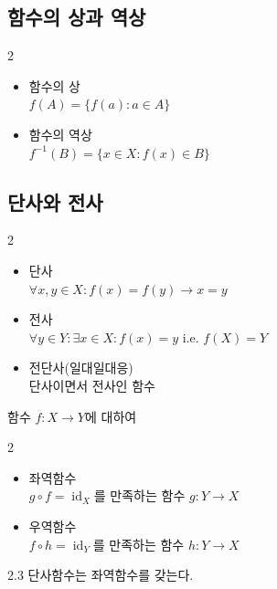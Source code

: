 \documentclass{article}
\begin{document}
\subsection{함수의 상과 역상}
\begin{multicols}{2}
    \begin{itemize}
        \item 함수의 상 \\
            $f(A)=\{f(a):a\in A\}$
        \item 함수의 역상 \\
            $f^{-1}(B)=\{x\in X:f(x)\in B\}$
    \end{itemize}
\end{multicols}

\newpage
\subsection{단사와 전사}
\begin{multicols}{2}
    \begin{itemize}
        \item 단사 \\
            $\forall x,y\in X:f(x)=f(y)\longrightarrow x=y$
        \item 전사 \\
            $\forall y\in Y:\exists x\in X:f(x)=y$ i.e. $f(X)=Y$
    \end{itemize}
\end{multicols}

\begin{itemize}
    \item 전단사(일대일대응) \\
        단사이면서 전사인 함수
\end{itemize}

\noindent 함수 $f:X\to Y$에 대하여
\begin{multicols}{2}
    \begin{itemize}
        \item 좌역함수 \\
            $g\circ f=\operatorname{id}_X$를 만족하는 함수 $g:Y\to X$
        \item 우역함수 \\
            $f\circ h=\operatorname{id}_Y$를 만족하는 함수 $h:Y\to X$
    \end{itemize}
\end{multicols}

\begin{prop}{}{2.3}
    단사함수는 좌역함수를 갖는다.
\end{prop}
\end{document}
